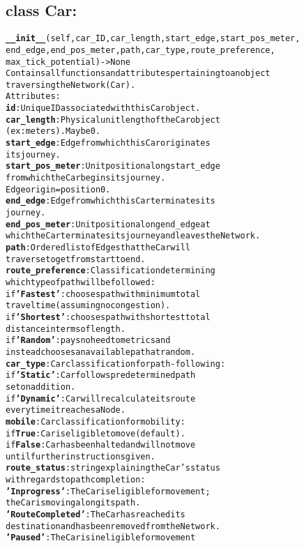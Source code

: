 \subsection{class Car:}

\begin{alltt}
\textbf{__init__}(self, car_ID, car_length, start_edge, start_pos_meter,
end_edge, end_pos_meter, path, car_type, route_preference,
max_tick_potential) -> None
Contains all functions and attributes pertaining to an object 
traversing the Network (Car).
Attributes:
    \textbf{id}:  Unique ID associated with this Car object.
    \textbf{car_length}:  Physical unit length of the Car object 
    (ex: meters).  May be 0.
    \textbf{start_edge}:  Edge from which this Car originates 
    its journey.
    \textbf{start_pos_meter}:  Unit position along start_edge 
    from which the Car begins its journey.  
    Edge origin = position 0.
    \textbf{end_edge}:  Edge from which this Car terminates its 
    journey.
    \textbf{end_pos_meter}:  Unit position along end_edge at 
    which the Car terminates its journey and leaves the Network.
    \textbf{path}:  Ordered list of Edges that the Car will 
    traverse to get from start to end.
    \textbf{route_preference}:  Classification determining 
    which type of path will be followed:
        if \textbf{'Fastest'}: chooses path with minimum total 
        travel time (assuming no congestion).
        if \textbf{'Shortest'}: chooses path with shortest total 
        distance in terms of length.
        if \textbf{'Random'}:  pays no heed to metrics and 
        instead chooses an available path at random.
    \textbf{car_type}:  Car classification for path-following:
        if \textbf{'Static'}:  Car follows predetermined path 
        set on addition.
        if \textbf{'Dynamic'}:  Car will recalculate its route 
        every time it reaches a Node. 
    \textbf{mobile}:  Car classification for mobility:
        if \textbf{True}:  Car is eligible to move (default).
        if \textbf{False}:  Car has been halted and will not move 
        until further instructions given.
    \textbf{route_status}:  string explaining the Car's status 
    with regards to path completion:
        \textbf{'In progress'}:  The Car is eligible for movement; 
        the Car is moving along its path.
        \textbf{'Route Completed'}:  The Car has reached its 
        destination and has been removed from the Network.
        \textbf{'Paused'}:  The Car is ineligible for movement 

\end{alltt}
